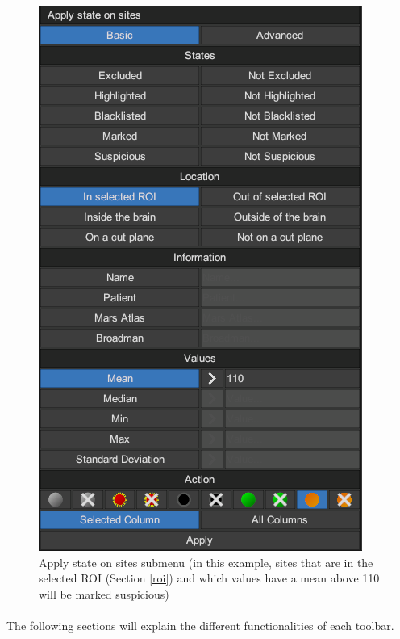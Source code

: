 \documentclass[a4paper]{article}
\begin{document}
\begin{figure}[H]
\begin{center}
\includegraphics[scale=0.5]{BasicStates.png}
\end{center}
\caption{\label{basicStates}Apply state on sites submenu (in this example, sites that are in the selected ROI (Section \ref{roi}) and which values have a mean above 110 will be marked suspicious)}
\end{figure}
\paragraph{} The following sections will explain the different functionalities of each toolbar.
\end{document}
